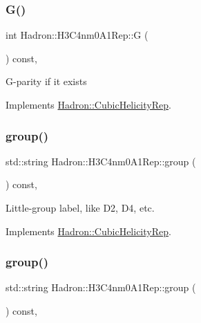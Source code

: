 \subsubsection{\texorpdfstring{G()}{G()}\hspace{0.1cm}{\footnotesize\ttfamily [3/3]}}
{\footnotesize\ttfamily int Hadron\+::\+H3\+C4nm0\+A1\+Rep\+::G (\begin{DoxyParamCaption}{ }\end{DoxyParamCaption}) const\hspace{0.3cm}{\ttfamily [inline]}, {\ttfamily [virtual]}}

G-\/parity if it exists 

Implements \mbox{\hyperlink{structHadron_1_1CubicHelicityRep_a50689f42be1e6170aa8cf6ad0597018b}{Hadron\+::\+Cubic\+Helicity\+Rep}}.

\mbox{\label{structHadron_1_1H3C4nm0A1Rep_a031edbff97795d7fd225e9a3d70b5d8f}} 
\subsubsection{\texorpdfstring{group()}{group()}\hspace{0.1cm}{\footnotesize\ttfamily [1/5]}}
{\footnotesize\ttfamily std\+::string Hadron\+::\+H3\+C4nm0\+A1\+Rep\+::group (\begin{DoxyParamCaption}{ }\end{DoxyParamCaption}) const\hspace{0.3cm}{\ttfamily [inline]}, {\ttfamily [virtual]}}

Little-\/group label, like D2, D4, etc. 

Implements \mbox{\hyperlink{structHadron_1_1CubicHelicityRep_a101a7d76cd8ccdad0f272db44b766113}{Hadron\+::\+Cubic\+Helicity\+Rep}}.

\mbox{\label{structHadron_1_1H3C4nm0A1Rep_a031edbff97795d7fd225e9a3d70b5d8f}} 
\subsubsection{\texorpdfstring{group()}{group()}\hspace{0.1cm}{\footnotesize\ttfamily [2/5]}}
{\footnotesize\ttfamily std\+::string Hadron\+::\+H3\+C4nm0\+A1\+Rep\+::group (\begin{DoxyParamCaption}{ }\end{DoxyParamCaption}) const\hspace{0.3cm}{\ttfamily [inline]}, {\ttfamily [virtual]}}

